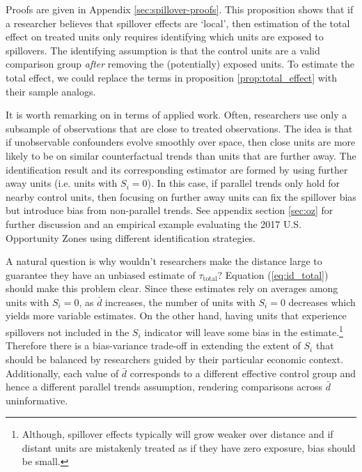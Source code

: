 Proofs are given in Appendix \ref{sec:spillover-proofs}. This proposition shows that if a researcher believes that spillover effects are `local', then estimation of the total effect on treated units only requires identifying which units are exposed to spillovers. The identifying assumption is that the control units are a valid comparison group \textit{after} removing the (potentially) exposed units. To estimate the total effect, we could replace the terms in proposition \ref{prop:total_effect} with their sample analogs.

\begin{remark}
  It is worth remarking on  in terms of applied work. Often, researchers use only a subsample of observations that are close to treated observations. The idea is that if unobservable confounders evolve smoothly over space, then close units are more likely to be on similar counterfactual trends than units that are further away. The identification result and its corresponding estimator are formed by using further away units (i.e. units with $S_i = 0$). In this case, if parallel trends only hold for nearby control units, then focusing on further away units can fix the spillover bias but introduce bias from non-parallel trends. See appendix section \ref{sec:oz} for further discussion and an empirical example evaluating the 2017 U.S. Opportunity Zones using different identification strategies.
\end{remark}

\begin{remark}
  A natural question is why wouldn't researchers make the distance large to guarantee they have an unbiased estimate of $\tau_{\text{total}}$? Equation (\ref{eq:id_total}) should make this problem clear. Since these estimates rely on averages among units with $S_i = 0$, as $\bar{d}$ increases, the number of units with $S_i = 0$ decreases which yields more variable estimates. On the other hand, having units that experience spillovers not included in the $S_i$ indicator will leave some bias in the estimate.\footnote{Although, spillover effects typically will grow weaker over distance and if distant units are mistakenly treated as if they have zero exposure, bias should be small.} Therefore there is a bias-variance trade-off in extending the extent of $S_i$ that should be balanced by researchers guided by their particular economic context. Additionally, each value of $\bar{d}$ corresponds to a different effective control group and hence a different parallel trends assumption, rendering comparisons across $\bar{d}$ uninformative.
\end{remark}


